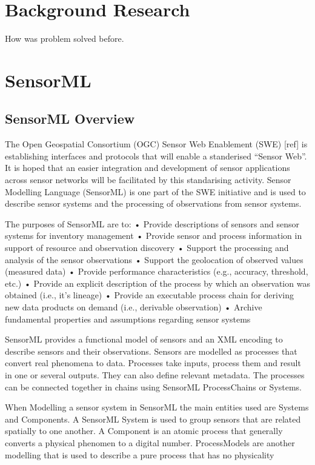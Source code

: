 \documentclass[]{final_report}
\begin{document}
\chapter{ Background Research}

How was problem solved before.


\chapter{SensorML}
\section{SensorML Overview}
The Open Geospatial Consortium (OGC) Sensor Web Enablement (SWE) [ref]  is establishing interfaces and protocols that will enable a standerised “Sensor Web”. It is hoped that an easier integration and development of sensor applications across sensor networks will be facilitated by this standarising activity. Sensor Modelling Language (SensorML) is one part of the SWE initiative and is used to describe sensor systems and the processing of observations from sensor systems.

The purposes of SensorML are to:
• Provide descriptions of sensors and sensor systems for inventory management
• Provide sensor and process information in support of resource and observation discovery
• Support the processing and analysis of the sensor observations
• Support the geolocation of observed values (measured data)
• Provide performance characteristics (e.g., accuracy, threshold, etc.)
• Provide an explicit description of the process by which an observation was obtained (i.e., it’s lineage)
• Provide an executable process chain for deriving new data products on demand (i.e., derivable observation)
• Archive fundamental properties and assumptions regarding sensor systems

SensorML provides a functional model of sensors and an XML encoding to describe sensors and their observations.
Sensors are modelled as processes that convert real phenomena to data. Processes take inputs, process them and result in one or several outputs. They can also define relevant metadata. The processes can be connected together in chains using SensorML ProcessChains or Systems. 

When Modelling a sensor system in SensorML the main entities used are Systems and Components. A SensorML System is used to group sensors that are related spatially to one another.  A Component is an atomic process that generally converts a physical phenomen to a digital number. ProcessModels are another modelling that is used to describe a pure process that has no physicality
\end{document}
